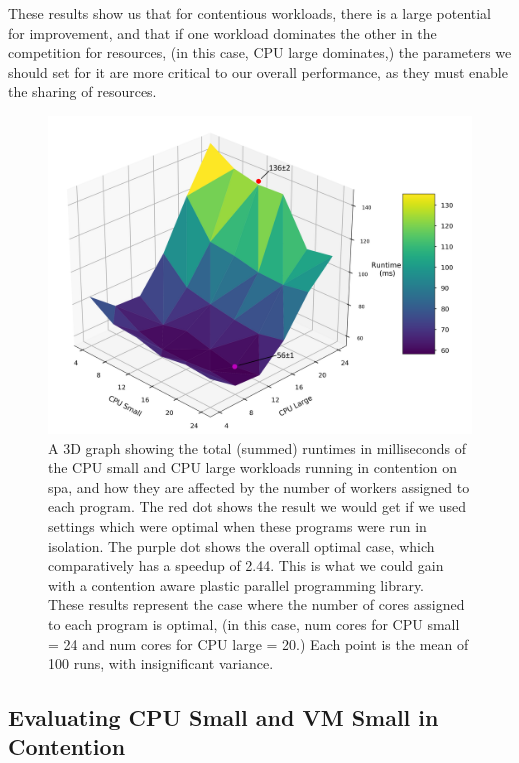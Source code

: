 These results show us that for contentious workloads, there is a large potential for improvement, and that if one workload dominates the other in the competition for resources, (in this case, CPU large dominates,) the parameters we should set for it are more critical to our overall performance, as they must enable the sharing of resources.



\begin{figure}[H]
    \includegraphics[width=1\textwidth]{graphics/contention/spa/otwc_cpu_small_and_cpu_large.png}
    \caption{A 3D graph showing the total (summed) runtimes in milliseconds of the CPU small and CPU large workloads running in contention on spa, and how they are affected by the number of workers assigned to each program. The red dot shows the result we would get if we used settings which were optimal when these programs were run in isolation. The purple dot shows the overall optimal case, which comparatively has a speedup of 2.44. This is what we could gain with a contention aware plastic parallel programming library. \\
    These results represent the case where the number of cores assigned to each program is optimal, (in this case, num cores for CPU small = 24 and num cores for CPU large = 20.) Each point is the mean of 100 runs, with insignificant variance.}
    \label{fig:con_spa_cpu_small_and_cpu_large}
\end{figure}



\subsection{Evaluating CPU Small and VM Small in Contention}
\label{section:results:evaluating_cpu_small_and_vm_small_in_contention}

